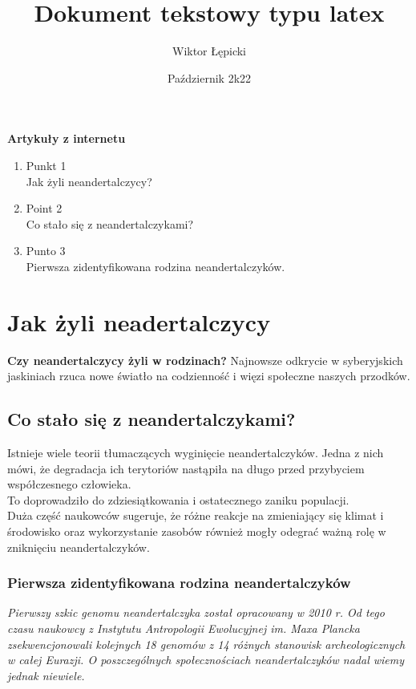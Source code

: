 \documentclass[12pt, letterpaper, titlepage]{article}
\title{Dokument tekstowy typu latex}
\author{Wiktor Łępicki}
\date{Październik 2k22}
\begin{document}
\maketitle
\begin{center}
\textbf{Artykuły z internetu}
\begin{enumerate} %
\item Punkt 1
\\Jak żyli neandertalczycy?
\item Point 2
\\Co stało się z neandertalczykami?
\item Punto 3
\\Pierwsza zidentyfikowana rodzina neandertalczyków.
\end{enumerate}
\end{center}
\newpage
\section{Jak żyli neadertalczycy}
\textbf{Czy neandertalczycy żyli w rodzinach?} Najnowsze odkrycie w syberyjskich jaskiniach rzuca nowe światło na codzienność i więzi społeczne naszych przodków.
\subsection{Co stało się z neandertalczykami?}
\textsf{Istnieje wiele teorii tłumaczących wyginięcie neandertalczyków. Jedna z nich mówi, że degradacja ich terytoriów nastąpiła na długo przed przybyciem współczesnego człowieka.
\\{\LARGE To doprowadziło do zdziesiątkowania i ostatecznego zaniku populacji.}
\\Duża część naukowców sugeruje, że różne reakcje na zmieniający się klimat i środowisko oraz wykorzystanie zasobów również mogły odegrać ważną rolę w zniknięciu neandertalczyków.}\subsubsection{Pierwsza zidentyfikowana rodzina neandertalczyków}
\textit{Pierwszy szkic genomu neandertalczyka został opracowany w 2010 r. Od tego czasu naukowcy z Instytutu Antropologii Ewolucyjnej im. Maxa Plancka zsekwencjonowali kolejnych 18 genomów z 14 różnych stanowisk archeologicznych w całej Eurazji. O poszczególnych społecznościach neandertalczyków nadal wiemy jednak niewiele.}
\end{document}
